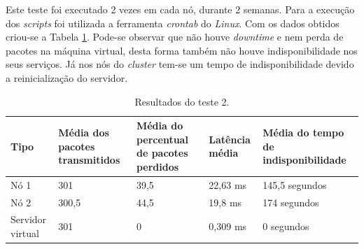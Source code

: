 Este teste foi executado 2 vezes em cada nó, durante 2 semanas. Para a execução dos \textit{scripts} foi utilizada a ferramenta 
\textit{crontab} do \textit{Linux}. Com os dados obtidos criou-se a Tabela \ref{tab:teste2resultados}.
Pode-se observar que não houve \textit{downtime} e nem perda de pacotes na máquina virtual, desta forma também não houve indisponibilidade nos 
seus serviços. Já nos nós do \textit{cluster} tem-se um tempo de indisponibilidade devido a reinicialização do servidor.


\begin{table}[h!]
\caption{Resultados do teste 2.}
\label{tab:teste2resultados}
\begin{center}
\begin{tabular}{|l|p{2.5cm}|p{2.5cm}|p{1.5cm}|p{3cm}|}\hline
\textbf{Tipo} & \textbf{Média dos pacotes transmitidos} & \textbf{Média do percentual de pacotes perdidos} & \textbf{Latência média} & \textbf{Média do tempo de indisponibilidade} \\\hline
Nó 1 & 301 & 39,5 & 22,63 ms & 145,5 segundos \\\hline
Nó 2 & 300,5 & 44,5 & 19,8 ms & 174 segundos\\\hline
Servidor virtual & 301 & 0 & 0,309 ms & 0 segundos \\\hline
\end{tabular}
\end{center}
\end{table}


